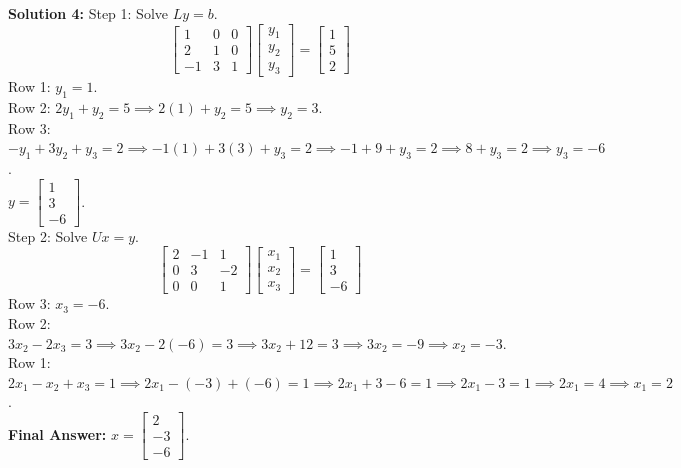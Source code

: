 \documentclass[11pt]{article}
\begin{document}
\textbf{Solution 4:}
Step 1: Solve $Ly = b$.
$$ \begin{bmatrix} 1 & 0 & 0 \\ 2 & 1 & 0 \\ -1 & 3 & 1 \end{bmatrix} \begin{bmatrix} y_1 \\ y_2 \\ y_3 \end{bmatrix} = \begin{bmatrix} 1 \\ 5 \\ 2 \end{bmatrix} $$
Row 1: $y_1 = 1$. \\
Row 2: $2y_1 + y_2 = 5 \implies 2(1) + y_2 = 5 \implies y_2 = 3$. \\
Row 3: $-y_1 + 3y_2 + y_3 = 2 \implies -1(1) + 3(3) + y_3 = 2 \implies -1 + 9 + y_3 = 2 \implies 8 + y_3 = 2 \implies y_3 = -6$. \\
$y = \begin{bmatrix} 1 \\ 3 \\ -6 \end{bmatrix}$. \\
Step 2: Solve $Ux = y$.
$$ \begin{bmatrix} 2 & -1 & 1 \\ 0 & 3 & -2 \\ 0 & 0 & 1 \end{bmatrix} \begin{bmatrix} x_1 \\ x_2 \\ x_3 \end{bmatrix} = \begin{bmatrix} 1 \\ 3 \\ -6 \end{bmatrix} $$
Row 3: $x_3 = -6$. \\
Row 2: $3x_2 - 2x_3 = 3 \implies 3x_2 - 2(-6) = 3 \implies 3x_2 + 12 = 3 \implies 3x_2 = -9 \implies x_2 = -3$. \\
Row 1: $2x_1 - x_2 + x_3 = 1 \implies 2x_1 - (-3) + (-6) = 1 \implies 2x_1 + 3 - 6 = 1 \implies 2x_1 - 3 = 1 \implies 2x_1 = 4 \implies x_1 = 2$. \\
\textbf{Final Answer:} $x = \begin{bmatrix} 2 \\ -3 \\ -6 \end{bmatrix}$.
\end{document}
